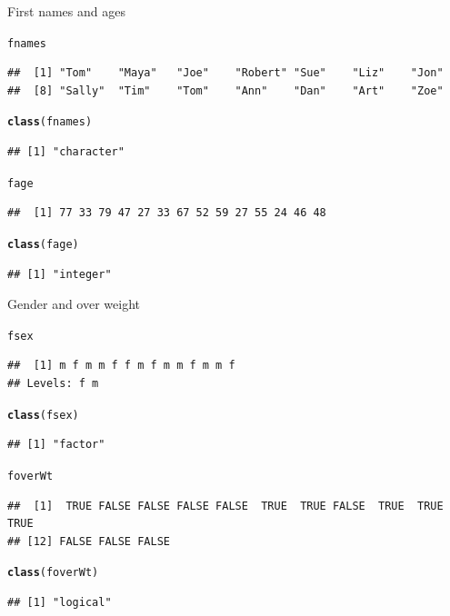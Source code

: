 \documentclass{beamer}\usepackage[]{graphicx}\usepackage[]{color}
\makeatletter
\newcommand{\hlstd}[1]{\textcolor[rgb]{0.345,0.345,0.345}{#1}}%
\newcommand{\hlkwd}[1]{\textcolor[rgb]{0.737,0.353,0.396}{\textbf{#1}}}%
\newenvironment{kframe}{%
 \def\at@end@of@kframe{}%
 \ifinner\ifhmode%
  \def\at@end@of@kframe{\end{minipage}}%
  \begin{minipage}{\columnwidth}%
 \fi\fi%
 \def\FrameCommand##1{\hskip\@totalleftmargin \hskip-\fboxsep
 \colorbox{shadecolor}{##1}\hskip-\fboxsep
     \hskip-\linewidth \hskip-\@totalleftmargin \hskip\columnwidth}%
 \MakeFramed {\advance\hsize-\width
   \@totalleftmargin\z@ \linewidth\hsize
   \@setminipage}}%
 {\par\unskip\endMakeFramed%
 \at@end@of@kframe}
\newenvironment{knitrout}{}{} %
\renewenvironment{knitrout}{\begin{singlespace}}{\end{singlespace}}
\theoremstyle{mystyle}
\makeatother
\begin{document}
\begin{frame}[fragile]{First names and ages}
\begin{knitrout}
\color{fgcolor}\begin{kframe}
\begin{alltt}
\hlstd{fnames}
\end{alltt}
\begin{verbatim}
##  [1] "Tom"    "Maya"   "Joe"    "Robert" "Sue"    "Liz"    "Jon"   
##  [8] "Sally"  "Tim"    "Tom"    "Ann"    "Dan"    "Art"    "Zoe"
\end{verbatim}
\begin{alltt}
\hlkwd{class}\hlstd{(fnames)}
\end{alltt}
\begin{verbatim}
## [1] "character"
\end{verbatim}
\begin{alltt}
\hlstd{fage}
\end{alltt}
\begin{verbatim}
##  [1] 77 33 79 47 27 33 67 52 59 27 55 24 46 48
\end{verbatim}
\begin{alltt}
\hlkwd{class}\hlstd{(fage)}
\end{alltt}
\begin{verbatim}
## [1] "integer"
\end{verbatim}
\end{kframe}
\end{knitrout}
\end{frame}

\begin{frame}[fragile]{Gender and over weight}
\begin{knitrout}
\color{fgcolor}\begin{kframe}
\begin{alltt}
\hlstd{fsex}
\end{alltt}
\begin{verbatim}
##  [1] m f m m f f m f m m f m m f
## Levels: f m
\end{verbatim}
\begin{alltt}
\hlkwd{class}\hlstd{(fsex)}
\end{alltt}
\begin{verbatim}
## [1] "factor"
\end{verbatim}
\begin{alltt}
\hlstd{foverWt}
\end{alltt}
\begin{verbatim}
##  [1]  TRUE FALSE FALSE FALSE FALSE  TRUE  TRUE FALSE  TRUE  TRUE  TRUE
## [12] FALSE FALSE FALSE
\end{verbatim}
\begin{alltt}
\hlkwd{class}\hlstd{(foverWt)}
\end{alltt}
\begin{verbatim}
## [1] "logical"
\end{verbatim}
\end{kframe}
\end{knitrout}
\end{frame}
\end{document}
